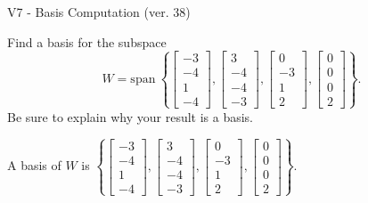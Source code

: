 \begin{exercise}
  \begin{exerciseTitle}V7 - Basis Computation (ver. 38)\end{exerciseTitle}
  \begin{exerciseStatement}
    Find a basis for the subspace 
\[W=\mathrm{span}\ \left\{\left[\begin{array}{r}
-3 \\
-4 \\
1 \\
-4
\end{array}\right] , \left[\begin{array}{r}
3 \\
-4 \\
-4 \\
-3
\end{array}\right] , \left[\begin{array}{r}
0 \\
-3 \\
1 \\
2
\end{array}\right] , \left[\begin{array}{r}
0 \\
0 \\
0 \\
2
\end{array}\right]\right\}.\]
 Be sure to explain why your result is a basis.


  \end{exerciseStatement}
  \begin{exerciseAnswer}
   A basis of \(W\) is  \(\left\{\left[\begin{array}{r}
-3 \\
-4 \\
1 \\
-4
\end{array}\right] , \left[\begin{array}{r}
3 \\
-4 \\
-4 \\
-3
\end{array}\right] , \left[\begin{array}{r}
0 \\
-3 \\
1 \\
2
\end{array}\right] , \left[\begin{array}{r}
0 \\
0 \\
0 \\
2
\end{array}\right]\right\}\).
  


  \end{exerciseAnswer}
\end{exercise}